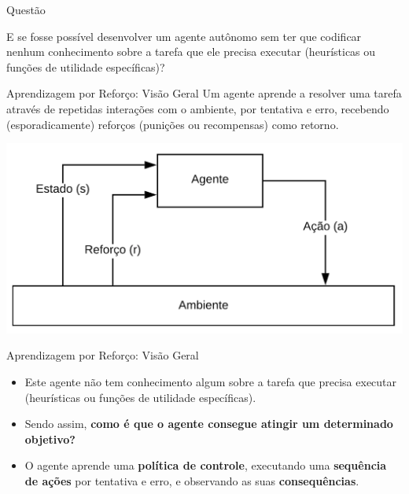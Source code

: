 \documentclass{beamer}
\begin{document}
\begin{frame}{Questão}

	E se fosse possível desenvolver um agente autônomo sem ter que codificar nenhum
	conhecimento sobre a tarefa que ele precisa executar (heurísticas ou funções de utilidade específicas)?

\end{frame}


\begin{frame}{Aprendizagem por Reforço: Visão Geral}
	\small
	Um agente aprende a resolver uma tarefa através de repetidas interações com o ambiente, por tentativa e erro, recebendo 
	(esporadicamente) reforços (punições ou recompensas) como retorno.
  \begin{center}
	\includegraphics[width=.7\textwidth]{figuras/visaoGeral.png}
\end{center}

\end{frame}

\begin{frame}{Aprendizagem por Reforço: Visão Geral}
	\begin{itemize}
	\item<1-> Este agente não tem conhecimento algum sobre a tarefa que precisa executar (heurísticas ou funções de utilidade específicas).
	\item<2-> Sendo assim, \textbf{{\color{red}como é que o agente consegue atingir um determinado objetivo?}}
	\item<3-> O agente aprende uma \textbf{política de controle}, executando uma \textbf{sequência de ações} por tentativa e erro, e observando as suas \textbf{consequências}.
	
	\end{itemize}
\end{frame}
	
\end{document}
